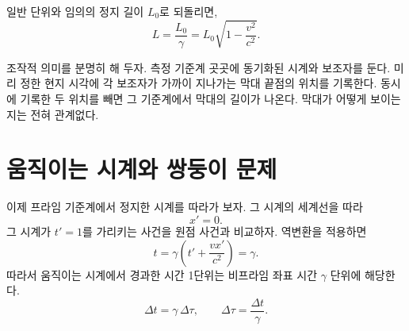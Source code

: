 일반 단위와 임의의 정지 길이 \(L_0\)로 되돌리면,
\begin{equation}
L=\frac{L_0}{\gamma}
 =L_0\sqrt{1-\frac{v^2}{c^2}}.
\label{eq:sr1-length-contraction}
\end{equation}

\begin{classroomqa}\end{classroomqa}

\begin{classroomqa}\end{classroomqa}

조작적 의미를 분명히 해 두자. 측정 기준계 곳곳에 동기화된 시계와 보조자를 둔다. 미리 정한 현지 시각에 각 보조자가 가까이 지나가는 막대 끝점의 위치를 기록한다. 동시에 기록한 두 위치를 빼면 그 기준계에서 막대의 길이가 나온다. 막대가 어떻게 보이는지는 전혀 관계없다.

\begin{classroomqa}\end{classroomqa}

\section{움직이는 시계와 쌍둥이 문제}

이제 프라임 기준계에서 정지한 시계를 따라가 보자. 그 시계의 세계선을 따라
\begin{equation}
x'=0.
\end{equation}
그 시계가 \(t'=1\)를 가리키는 사건을 원점 사건과 비교하자. 역변환을 적용하면
\begin{equation}
t=\gamma\left(t'+\frac{vx'}{c^2}\right)=\gamma.
\end{equation}
따라서 움직이는 시계에서 경과한 시간 1단위는 비프라임 좌표 시간 \(\gamma\) 단위에 해당한다.
\begin{equation}
\Delta t=\gamma\,\Delta\tau,
\qquad
\Delta\tau=\frac{\Delta t}{\gamma}.
\label{eq:sr1-time-dilation}
\end{equation}

